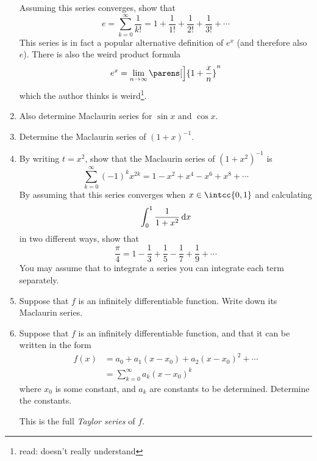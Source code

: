 \begin{enumerate}
  Assuming this series converges, show that
  \begin{equation*}
   e =
   \sum_{k = 0}^\infty \frac 1{k!} =
   1 + \frac 1{1!} + \frac 1{2!} + \frac 1{3!} + \dotsb
  \end{equation*}
  This series is in fact a popular alternative definition of \(e^x\) (and
  therefore also \(e\)). There is also the weird product formula
  \begin{equation*}
   e^x =
    \lim_{n \to \infty}
     \parens[\Big]{
      1 + \frac xn
     }^n
  \end{equation*}
  which the author thinks is weird\footnote{
   read: doesn't really understand
  }.
 \item
  Also determine Maclaurin series for \(\sin x\) and \(\cos x\).
 \item
  Determine the Maclaurin series of \((1 + x)^{-1}\).
 \item
  By writing \(t = x^2\), show that the Maclaurin series of \((1 + x^2)^{-1}\)
  is
  \begin{equation*}
   \sum_{k = 0}^\infty (-1)^k x^{2k} = 1 - x^2 + x^4 - x^6 + x^8 + \dotsb
  \end{equation*}
  By assuming that this series converges when \(x \in \intcc{0, 1}\) and
  calculating
  \begin{equation*}
   \integ[0]<1>{\frac 1{1 + x^2}}{x}
  \end{equation*}
  in two different ways, show that
  \begin{equation*}
   \frac \pi 4 = 1 - \frac 13 + \frac 15 - \frac 17 + \frac 19 + \dotsb
  \end{equation*}
  You may assume that to integrate a series you can integrate each term
  separately.
 \item
  Suppose that \(f\) is an infinitely differentiable function. Write down its
  Maclaurin series.
 \item
  Suppose that \(f\) is an infinitely differentiable function, and that it can
  be written in the form
  \begin{align*}
   f(x) &= a_0 + a_1(x - x_0) + a_2(x - x_0)^2 + \dotsb \\
        &= \sum_{k = 0}^\infty a_k(x - x_0)^k
  \end{align*}
  where \(x_0\) is some constant, and \(a_k\) are constants to be determined.
  Determine the constants.

  This is the full \emph{Taylor series} of \(f\).


\end{enumerate}
